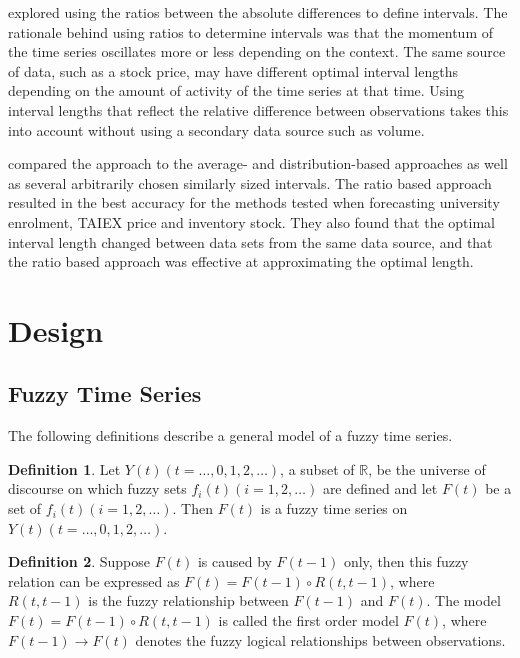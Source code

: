 \documentclass{article}
\theoremstyle{definition}
\newtheorem{ftsdef}{Definition}
\begin{document}
\cite{huarng2006ratio} explored using the ratios between the absolute differences to define intervals. The rationale behind using ratios to determine intervals was that the momentum of the time series oscillates more or less depending on the context. The same source of data, such as a stock price, may have different optimal interval lengths depending on the amount of activity of the time series at that time. Using interval lengths that reflect the relative difference between observations takes this into account without using a secondary data source such as volume.

\cite{huarng2006ratio} compared the approach to the average- and distribution-based approaches as well as several arbitrarily chosen similarly sized intervals. The ratio based approach resulted in the best accuracy for the methods tested when forecasting university enrolment, TAIEX price and inventory stock. They also found that the optimal interval length changed between data sets from the same data source, and that the ratio based approach was effective at approximating the optimal length.

\section{Design}

\label{design}

\subsection{Fuzzy Time Series}
\label{fts-design}
The following definitions describe a general model of a fuzzy time series.

\begin{ftsdef}
\label{def1}
Let $Y(t)(t= \ldots,0,1,2, \ldots)$, a subset of $\mathbb{R}$, be the universe of discourse on which fuzzy sets $f_i(t)(i=1,2,\ldots)$ are defined and let $F(t)$ be a set of $f_i(t)(i=1,2,\ldots)$. Then $F(t)$ is a fuzzy time series on $Y(t)(t= \ldots,0,1,2, \ldots)$.
\end{ftsdef}

\begin{ftsdef}
\label{def2}
Suppose $F(t)$ is caused by $F(t-1)$ only, then this fuzzy relation can be expressed as $F(t)=F(t-1) \circ R(t,t-1)$, where $R(t,t-1)$ is the fuzzy relationship between $F(t-1)$ and $F(t)$. The model $F(t)=F(t-1) \circ R(t,t-1)$ is called the first order model $F(t)$, where $F(t-1) \rightarrow F(t)$ denotes the fuzzy logical relationships between observations.
\end{ftsdef}
\end{document}
